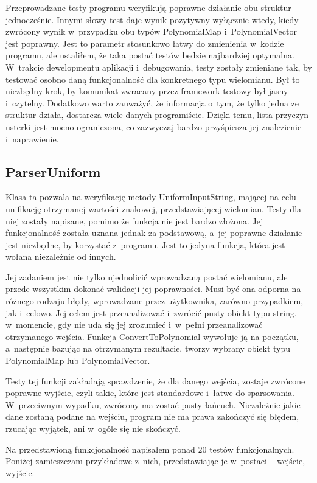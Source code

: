 Przeprowadzane testy programu weryfikują poprawne działanie obu struktur jednocześnie. Innymi słowy test daje wynik pozytywny wyłącznie wtedy, kiedy zwrócony wynik w~przypadku obu typów PolynomialMap i~PolynomialVector jest poprawny. Jest to parametr stosunkowo łatwy do zmienienia w~kodzie programu, ale ustaliłem, że taka postać testów będzie najbardziej optymalna. W~trakcie dewelopmentu aplikacji i~debugowania, testy zostały zmieniane tak, by testować osobno daną funkcjonalność dla konkretnego typu wielomianu. Był to niezbędny krok, by komunikat zwracany przez framework testowy był jasny i~czytelny. Dodatkowo warto zauważyć, że informacja o~tym, że tylko jedna ze struktur działa, dostarcza wiele danych programiście. Dzięki temu, lista przyczyn usterki jest mocno ograniczona, co zazwyczaj bardzo przyśpiesza jej znalezienie i~naprawienie.

\subsection{ParserUniform}

Klasa ta pozwala na weryfikację metody UniformInputString, mającej na celu unifikację otrzymanej wartości znakowej, przedstawiającej wielomian. Testy dla niej zostały napisane, pomimo że funkcja nie jest bardzo złożona. Jej funkcjonalność została uznana jednak za podstawową, a~jej poprawne działanie jest niezbędne, by korzystać z~programu. Jest to jedyna funkcja, która jest wołana niezależnie od innych.

Jej zadaniem jest nie tylko ujednolicić wprowadzaną postać wielomianu, ale przede wszystkim dokonać walidacji jej poprawności. Musi być ona odporna na różnego rodzaju błędy, wprowadzane przez użytkownika, zarówno przypadkiem, jak i~celowo. Jej celem jest przeanalizować i~zwrócić pusty obiekt typu string, w~momencie, gdy nie uda się jej zrozumieć i~w~pełni przeanalizować otrzymanego wejścia. Funkcja ConvertToPolynomial wywołuje ją na początku, a~następnie bazując na otrzymanym rezultacie, tworzy wybrany obiekt typu PolynomialMap lub PolynomialVector.

Testy tej funkcji zakładają sprawdzenie, że dla danego wejścia, zostaje zwrócone poprawne wyjście, czyli takie, które jest standardowe i~łatwe do sparsowania. W~przeciwnym wypadku, zwrócony ma zostać pusty łańcuch. Niezależnie jakie dane zostaną podane na wejściu, program nie ma prawa zakończyć się błędem, rzucając wyjątek, ani w~ogóle się nie skończyć.

Na przedstawioną funkcjonalność napisałem ponad $20$ testów funkcjonalnych. Poniżej zamieszczam przykładowe z~nich, przedstawiając je w~postaci -- wejście, wyjście. 

